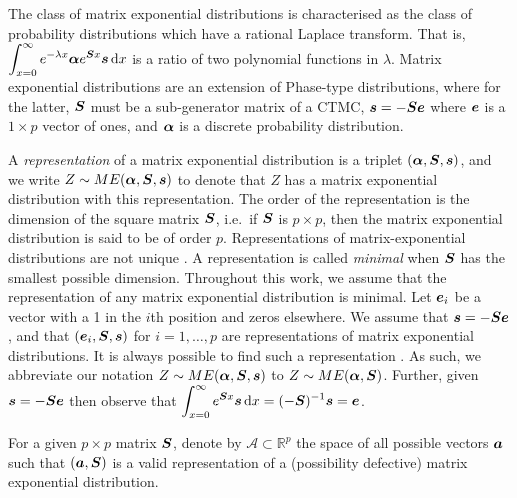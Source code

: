 The class of matrix exponential distributions is characterised as the class of probability distributions which have a rational Laplace transform. That is, \(\displaystyle \int_{x=0}^\infty e^{-\lambda x}\boldsymbol \alpha e^{\boldsymbol S x}\boldsymbol s \, \mathrm{d} x\) is a ratio of two polynomial functions in \(\lambda\). Matrix exponential distributions are an extension of Phase-type distributions, where for the latter, \(\boldsymbol S\) must be a sub-generator matrix of a CTMC, \(\boldsymbol s = -\boldsymbol S\boldsymbol e\) where \(\boldsymbol e\) is a \(1\times p\) vector of ones, and \(\boldsymbol \alpha\) is a discrete probability distribution.  

A \emph{representation} of a matrix exponential distribution is a triplet \((\boldsymbol \alpha, \boldsymbol S, \boldsymbol s)\), and we write \(Z\sim ME(\boldsymbol \alpha, \boldsymbol S, \boldsymbol s)\) to denote that \(Z\) has a matrix exponential distribution with this representation. The order of the representation is the dimension of the square matrix \(\boldsymbol S\), i.e.~if \(\boldsymbol S\) is \(p\times p\), then the matrix exponential distribution is said to be of order \(p\). Representations of matrix-exponential distributions are not unique \citep{MEinAP}. A representation is called \emph{minimal} when \(\boldsymbol S\) has the smallest possible dimension. Throughout this work, we assume that the representation of any matrix exponential distribution is minimal. Let \(\boldsymbol e_i\) be a vector with a 1 in the \(i\)th position and zeros elsewhere. We assume that \(\boldsymbol s = -\boldsymbol S\boldsymbol e\), and that \((\boldsymbol e_i,\boldsymbol S,\boldsymbol s)\) for \(i=1,\dots,p\) are representations of matrix exponential distributions. It is always possible to find such a representation \cite[Theorem 4.5.17, Corollary 4.5.18]{MEinAP}. As such, we abbreviate our notation \(Z\sim ME(\boldsymbol \alpha, \boldsymbol S, \boldsymbol s)\) to \(Z\sim ME(\boldsymbol \alpha, \boldsymbol S)\). Further, given \(\boldsymbol s=-\boldsymbol S\boldsymbol e\) then observe that  \(\displaystyle \int_{x=0}^\infty e^{\boldsymbol S x} \boldsymbol s\, \mathrm{d} x = (-\boldsymbol S)^{-1}\boldsymbol s= \boldsymbol e\). 

For a given \(p\times p\) matrix \(\boldsymbol S\), denote by \(\mathcal{A}\subset \mathbb R^p\) the space of all possible vectors \(\boldsymbol a\) such that \((\boldsymbol a, \boldsymbol S)\) is a valid representation of a (possibility defective) matrix exponential distribution. %

